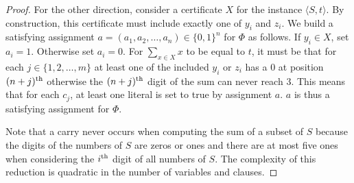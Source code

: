 \begin{proof}
	For the other direction, consider a certificate \(X\) for the instance
	\(\langle S,t\rangle\). By construction, this certificate must include
	exactly one of \(y_i\) and \(z_i\). We build a satisfying assignment \(a =
	(a_1,a_2,\ldots,a_n) \in \{0,1\}^n\) for \(\Phi\) as follows. If \(y_i \in
	X\), set \(a_i = 1\). Otherwise set \(a_i = 0\). For \(\sum_{x \in X} x\)
	to be equal to \(t\), it must be that for each \(j \in \{1,2,\ldots,m\}\)
	at least one of the included \(y_i\) or \(z_i\) has a \(0\) at position
	\((n+j)^{\text{th}}\) otherwise the \((n+j)^{\text{th}}\) digit of the sum can never
	reach \(3\). This means that for each \(c_j\), at least one literal is set
	to true by assignment \(a\). \(a\) is thus a satisfying assignment for
	\(\Phi\).

	Note that a carry never occurs when computing the sum of a subset of \(S\)
	because the digits of the numbers of \(S\) are zeros or ones and there are
	at most five ones when considering the \(i^{\text{th}}\) digit of all numbers of
	\(S\). The complexity of this reduction is quadratic in the number of
	variables and clauses.
\end{proof}

